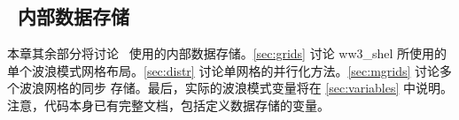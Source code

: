 \vssub
\subsection{~内部数据存储} \label{sec:common}
\vssub

本章其余部分将讨论 \ws\ 使用的内部数据存储。\para\ref{sec:grids} 讨论
{\file ww3\_shel} 所使用的单个波浪模式网格布局。\para\ref{sec:distr}
讨论单网格的并行化方法。\para\ref{sec:mgrids} 讨论多个波浪网格的同步
存储。最后，实际的波浪模式变量将在 \para\ref{sec:variables} 中说明。
注意，代码本身已有完整文档，包括定义数据存储的变量。
